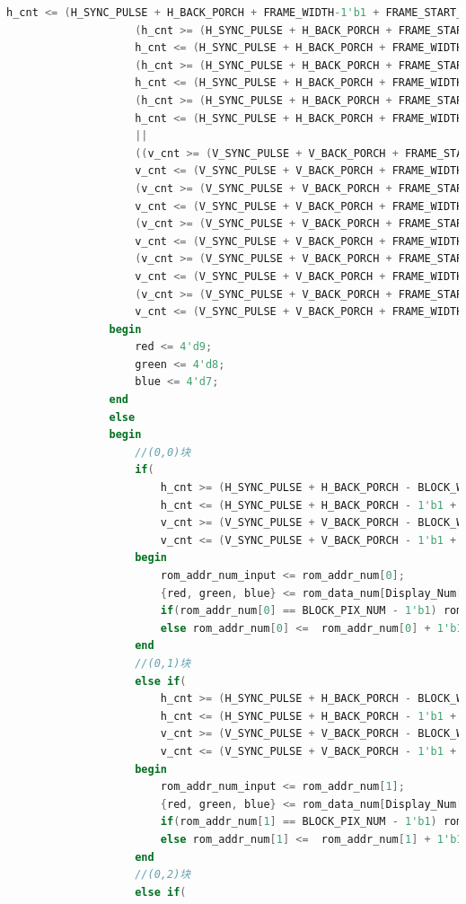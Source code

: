 \documentclass[UTF8]{article}
\begin{document}
\begin{lstlisting}[language=Verilog]
					h_cnt <= (H_SYNC_PULSE + H_BACK_PORCH + FRAME_WIDTH-1'b1 + FRAME_START_H_1)) ||
					(h_cnt >= (H_SYNC_PULSE + H_BACK_PORCH + FRAME_START_H_2) &&
					h_cnt <= (H_SYNC_PULSE + H_BACK_PORCH + FRAME_WIDTH-1'b1 + FRAME_START_H_2)) || 
					(h_cnt >= (H_SYNC_PULSE + H_BACK_PORCH + FRAME_START_H_3) &&
					h_cnt <= (H_SYNC_PULSE + H_BACK_PORCH + FRAME_WIDTH-1'b1 + FRAME_START_H_3)) || 
					(h_cnt >= (H_SYNC_PULSE + H_BACK_PORCH + FRAME_START_H_4) &&
					h_cnt <= (H_SYNC_PULSE + H_BACK_PORCH + FRAME_WIDTH-1'b1 + FRAME_START_H_4))) 
					|| 
					((v_cnt >= (V_SYNC_PULSE + V_BACK_PORCH + FRAME_START_V_0) &&
					v_cnt <= (V_SYNC_PULSE + V_BACK_PORCH + FRAME_WIDTH-1'b1 + FRAME_START_V_0)) ||
					(v_cnt >= (V_SYNC_PULSE + V_BACK_PORCH + FRAME_START_V_1) &&
					v_cnt <= (V_SYNC_PULSE + V_BACK_PORCH + FRAME_WIDTH-1'b1 + FRAME_START_V_1)) ||
					(v_cnt >= (V_SYNC_PULSE + V_BACK_PORCH + FRAME_START_V_2) &&
					v_cnt <= (V_SYNC_PULSE + V_BACK_PORCH + FRAME_WIDTH-1'b1 + FRAME_START_V_2)) ||
					(v_cnt >= (V_SYNC_PULSE + V_BACK_PORCH + FRAME_START_V_3) &&
					v_cnt <= (V_SYNC_PULSE + V_BACK_PORCH + FRAME_WIDTH-1'b1 + FRAME_START_V_3)) ||
					(v_cnt >= (V_SYNC_PULSE + V_BACK_PORCH + FRAME_START_V_4) &&
					v_cnt <= (V_SYNC_PULSE + V_BACK_PORCH + FRAME_WIDTH-1'b1 + FRAME_START_V_4))))
				begin
					red <= 4'd9;
					green <= 4'd8;
					blue <= 4'd7;
				end
				else
				begin
					//(0,0)块
					if(
						h_cnt >= (H_SYNC_PULSE + H_BACK_PORCH - BLOCK_WIDTH + FRAME_START_H_1) &&
						h_cnt <= (H_SYNC_PULSE + H_BACK_PORCH - 1'b1 + FRAME_START_H_1) && 
						v_cnt >= (V_SYNC_PULSE + V_BACK_PORCH - BLOCK_WIDTH + FRAME_START_V_1) &&
						v_cnt <= (V_SYNC_PULSE + V_BACK_PORCH - 1'b1 + FRAME_START_V_1))
					begin
						rom_addr_num_input <= rom_addr_num[0];
						{red, green, blue} <= rom_data_num[Display_Num[3:0]];
						if(rom_addr_num[0] == BLOCK_PIX_NUM - 1'b1) rom_addr_num[0] <=  13'd0;
						else rom_addr_num[0] <=  rom_addr_num[0] + 1'b1;
					end
					//(0,1)块
					else if(
						h_cnt >= (H_SYNC_PULSE + H_BACK_PORCH - BLOCK_WIDTH + FRAME_START_H_2) &&
						h_cnt <= (H_SYNC_PULSE + H_BACK_PORCH - 1'b1 + FRAME_START_H_2)  && 
						v_cnt >= (V_SYNC_PULSE + V_BACK_PORCH - BLOCK_WIDTH + FRAME_START_V_1) &&
						v_cnt <= (V_SYNC_PULSE + V_BACK_PORCH - 1'b1 + FRAME_START_V_1))
					begin
						rom_addr_num_input <= rom_addr_num[1];
						{red, green, blue} <= rom_data_num[Display_Num[7:4]];
						if(rom_addr_num[1] == BLOCK_PIX_NUM - 1'b1) rom_addr_num[1] <=  13'd0;
						else rom_addr_num[1] <=  rom_addr_num[1] + 1'b1;
					end
					//(0,2)块
					else if(

\end{lstlisting}
\end{document}
